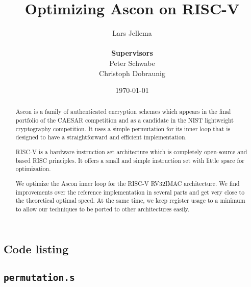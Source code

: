 \documentclass{article}
\title{Optimizing Ascon on RISC-V}
\author{Lars Jellema \\\\
    \textbf{\small Supervisors} \\
    \small Peter Schwabe \\
    \small Christoph Dobraunig}
\date{\today}
\begin{document}
\maketitle

\begin{abstract}

Ascon is a family of authenticated encryption schemes which appears in the
final portfolio of the CAESAR competition and as a candidate in the NIST
lightweight cryptography competition. It uses a simple permutation for its
inner loop that is designed to have a straightforward and efficient
implementation.

RISC-V is a hardware instruction set architecture which is completely
open-source and based RISC principles. It offers a small and simple
instruction set with little space for optimization.

We optimize the Ascon inner loop for the RISC-V RV32IMAC architecture. We
find improvements over the reference implementation in several parts and get
very close to the theoretical optimal speed. At the same time, we keep
register usage to a minimum to allow our techniques to be ported to other
architectures easily.

\end{abstract}

\clearpage










\begin{appendices}



\section{Code listing}

\subsection{\texttt{permutation.s}}



\end{appendices}
\end{document}
